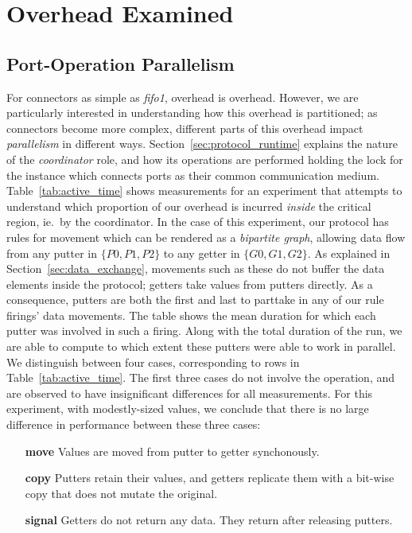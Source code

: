 \section{Overhead Examined}

\subsection{Port-Operation Parallelism}

For connectors as simple as \textit{fifo1}, overhead is overhead. However, we are particularly interested in understanding how this overhead is partitioned; as connectors become more complex, different parts of this overhead impact \textit{parallelism} in different ways. Section~\ref{sec:protocol_runtime} explains the nature of the \textit{coordinator} role, and how its operations are performed holding the lock for the  instance which connects ports as their common communication medium. Table~\ref{tab:active_time} shows measurements for an experiment that attempts to understand which proportion of our overhead is incurred \textit{inside} the critical region, ie.\ by the coordinator. In the case of this experiment, our protocol has rules for movement which can be rendered as a \textit{bipartite graph}, allowing data flow from any putter in $\{P0, P1, P2\}$ to any getter in $\{G0, G1, G2\}$. As explained in Section~\ref{sec:data_exchange}, movements such as these do not buffer the data elements inside the protocol; getters take values from putters directly. As a consequence, putters are both the first and last to parttake in any of our rule firings' data movements. The table shows the mean duration for which each putter was involved in such a firing. Along with the total duration of the run, we are able to compute to which extent these putters were able to work in parallel. We distinguish between four cases, corresponding to rows in Table~\ref{tab:active_time}. The first three cases do not involve the  operation, and are observed to have insignificant differences for all measurements. For this experiment, with modestly-sized values, we conclude that there is no large difference in performance between these three cases:
\begin{enumerate}
	\item [\textbf{move}] Values are moved from putter to getter synchonously.
	\item [\textbf{copy}] Putters retain their values, and getters replicate them with a bit-wise copy that does not mutate the original.
	\item [\textbf{signal}] Getters do not return any data. They return after releasing putters.
\end{enumerate}

